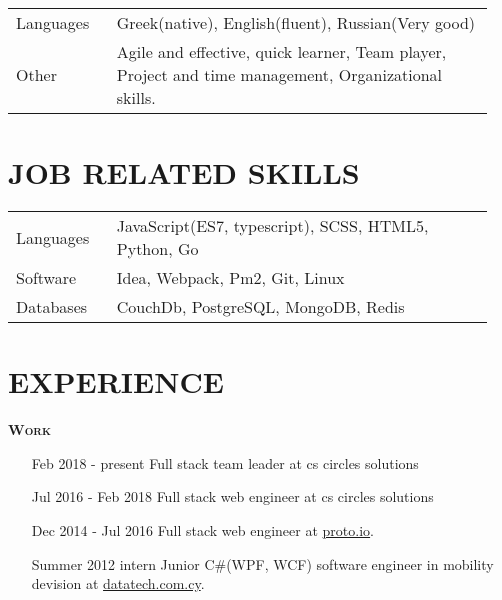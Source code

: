 \documentclass[margin, 10pt]{res} %
\begin{document}
\begin{resume}
\begin{tabular}{p{0.2\linewidth} p{0.75\linewidth}}
            Languages & Greek(native), English(fluent), Russian(Very good)                    \\
            Other & Agile and effective, quick learner, Team player, Project and time management, Organizational skills.

        \end{tabular}

        \section{JOB RELATED SKILLS}

        \begin{tabular}{p{0.2\linewidth} p{0.75\linewidth}}

            Languages & JavaScript(ES7, typescript), SCSS, HTML5, Python, Go \\
            Software & Idea, Webpack, Pm2, Git, Linux \\
            Databases & CouchDb, PostgreSQL, MongoDB, Redis

        \end{tabular}

        \section{EXPERIENCE}

        \textsc{ \textbf{Work}}

        \begin{itemize}

            \item[Feb 2018 - present] Full stack team leader at cs circles solutions  \\

            \item[Jul 2016 - Feb 2018] Full stack web engineer at cs circles solutions \\

            \item[Dec 2014 - Jul 2016] Full stack web engineer at
            \href{https://proto.io/}{proto.io}. \\

            \item[Summer 2012 intern] Junior C\#(WPF, WCF) software engineer in mobility devision at
            \href{http://www.datatech.com.cy/}{datatech.com.cy}. \\

        \end{itemize}


\end{resume}
\end{document}
